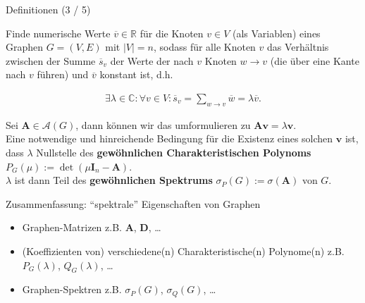 \documentclass[aspectratio=169]{beamer}
\begin{document}
\begin{frame}{Definitionen (3 / 5)}
    
    \begin{definition*}
        
        Finde numerische Werte $\overline v \in \mathbb R$ für die Knoten $v \in V$ (als Variablen) eines Graphen $G = (V, E)$ mit $|V| = n$, sodass für alle Knoten $v$ das Verhältnis zwischen der Summe $\overline s_v$ der Werte der nach $v$ Knoten $w \to v$ (die über eine Kante nach $v$ führen) und $\overline v$ konstant ist, d.h.
    
        \begin{align*}
            \exists \lambda \in \mathbb C:
                \forall v \in V:
                    \overline s_v = \sum_{w \to v} \overline w = \lambda \overline v.
        \end{align*}
    
        Sei $\mathbf A \in \mathcal A(G)$, dann können wir das umformulieren zu $\mathbf A \mathbf v = \lambda \mathbf v$. \\
        Eine notwendige und hinreichende Bedingung für die Existenz eines solchen $\mathbf v$ ist, dass $\lambda$ Nullstelle des \textbf{gewöhnlichen Charakteristischen Polynoms} $P_G(\mu) := \det(\mu \mathbf I_n - \mathbf A)$. \\
        $\lambda$ ist dann Teil des \textbf{gewöhnlichen Spektrums} $\sigma_P(G) := \sigma(\mathbf A)$ von $G$.

    \end{definition*}

\end{frame}

\begin{frame}{Zusammenfassung: \enquote{spektrale} Eigenschaften von Graphen}

    \begin{block}{}

        \begin{itemize}
            \item Graphen-Matrizen z.B. $\mathbf A$, $\mathbf D$, \dots
            \item (Koeffizienten von) verschiedene(n) Charakteristische(n) Polynome(n) z.B. $P_G(\lambda)$, $Q_G(\lambda)$, \dots
            \item Graphen-Spektren z.B. $\sigma_P(G)$, $\sigma_Q(G)$, \dots
        \end{itemize}

    \end{block}

\end{frame}
\end{document}

